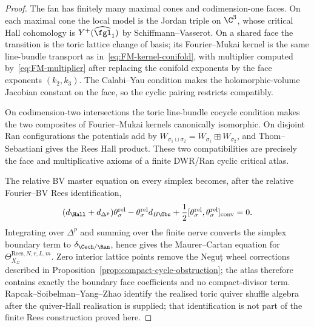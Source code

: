 \begin{proof}
The fan has finitely many maximal cones and codimension-one faces. On
each maximal cone the local model is the Jordan triple on $\C^3$, whose
critical Hall cohomology is $Y^+(\widehat{\fgl}_1)$ by
Schiffmann--Vasserot. On a shared face the transition is the toric
lattice change of basis; its Fourier--Mukai kernel is the same
line-bundle transport as in~\eqref{eq:FM-kernel-conifold}, with
multiplier computed by~\eqref{eq:FM-multiplier} after replacing the
conifold exponents by the face exponents $(k_2,k_3)$. The Calabi--Yau
condition makes the holomorphic-volume Jacobian constant on the face,
so the cyclic pairing restricts compatibly.

On codimension-two intersections the toric line-bundle cocycle
condition makes the two composites of Fourier--Mukai kernels canonically
isomorphic. On disjoint Ran configurations the potentials add by
$W_{\sigma_1\sqcup\sigma_2}=W_{\sigma_1}\boxplus W_{\sigma_2}$, and
Thom--Sebastiani gives the Rees Hall product. These two compatibilities
are precisely the face and multiplicative axioms of a finite DWR/Ran
cyclic critical atlas.

The relative BV master equation on every simplex becomes, after the
relative Fourier--BV Rees identification,
\[
 (d_{\Hall}+d_{\Delta^p})\theta_\sigma^{\mathrm{rel}}
 -\theta_\sigma^{\mathrm{rel}}d_{B\Obs}
 +\frac12[\theta_\sigma^{\mathrm{rel}},\theta_\sigma^{\mathrm{rel}}]_{\mathrm{conv}}
 =0 .
\]
Integrating over $\Delta^p$ and summing over the finite nerve converts
the simplex boundary term to $\delta_{\Cech/\Ran}$, hence gives the
Maurer--Cartan equation for
$\Theta_{X_\Sigma}^{\mathrm{Rees},N,r,L,m}$. Zero interior lattice
points remove the Neguț wheel corrections described in
Proposition~\ref{prop:compact-cycle-obstruction}; the atlas therefore
contains exactly the boundary face coefficients and no compact-divisor
term. Rapcak--Soibelman--Yang--Zhao identify the realised toric quiver
shuffle algebra after the quiver-Hall realisation is supplied; that
identification is not part of the finite Rees construction proved here.
\end{proof}

